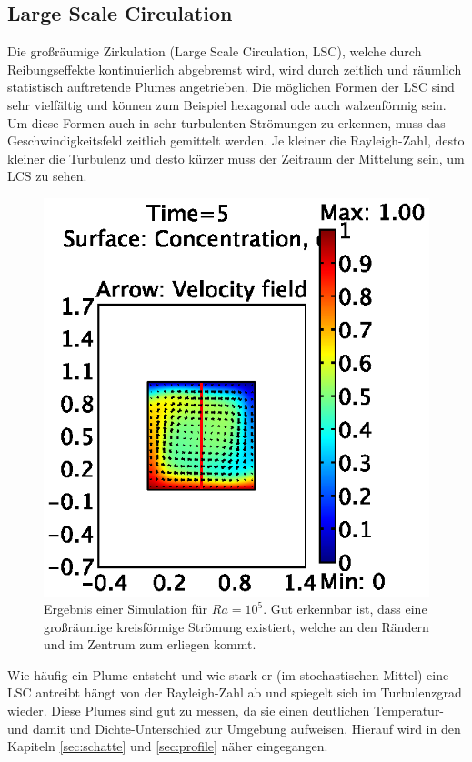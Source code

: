 \documentclass[12pt,a4paper,titlepage,headinclude]{scrartcl}
\numberwithin{equation}{subsection}
\begin{document}
\subsection{Large Scale Circulation}
Die großräumige Zirkulation (Large Scale Circulation, LSC), welche durch Reibungseffekte kontinuierlich abgebremst wird, wird durch zeitlich und räumlich statistisch auftretende Plumes angetrieben.
Die möglichen Formen der LSC sind sehr vielfältig und können zum Beispiel hexagonal ode auch walzenförmig sein.
Um diese Formen auch in sehr turbulenten Strömungen zu erkennen, muss das Geschwindigkeitsfeld zeitlich gemittelt werden. 
Je kleiner die Rayleigh-Zahl, desto kleiner die Turbulenz und desto kürzer muss der Zeitraum der Mittelung sein, um LCS zu sehen.
\begin{figure}[!ht]
\centering
\includegraphics{1e5.eps}
\caption{Ergebnis einer Simulation für $Ra=10^5$. Gut erkennbar ist, dass eine großräumige kreisförmige Strömung existiert, welche an den Rändern und im Zentrum zum erliegen kommt.}
\label{fig:1e5_num}
\end{figure}

Wie häufig ein Plume entsteht und wie stark er (im stochastischen Mittel) eine LSC antreibt hängt von der Rayleigh-Zahl ab und spiegelt sich im Turbulenzgrad wieder.
Diese Plumes sind gut zu messen, da sie einen deutlichen Temperatur- und damit und Dichte-Unterschied zur Umgebung aufweisen.
Hierauf wird in den Kapiteln \ref{sec:schatte} und \ref{sec:profile} näher eingegangen.
\end{document}
